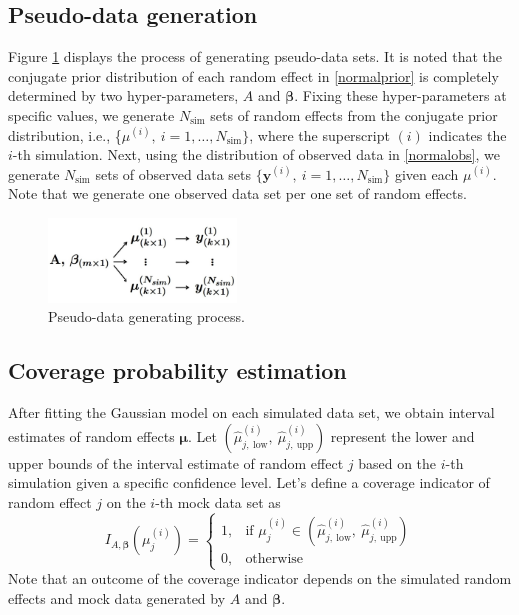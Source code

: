 \documentclass[article]{jss}
\begin{document}
\subsection{Pseudo-data generation}\label{data_generation}
Figure \ref{fig:pseudo} displays the process of generating pseudo-data sets. It is noted that  the conjugate prior distribution of each random effect in  \eqref{normalprior} is completely determined by two hyper-parameters, $A$ and $\boldsymbol{\beta}$. Fixing these hyper-parameters at specific values, we generate  $N_{\textrm{sim}}$ sets of random effects from the conjugate prior distribution, i.e., \{{\boldmath $\mu$}$^{(i)},~i=1, \ldots, N_{\textrm{sim}}\}$, where the superscript $(i)$ indicates the $i$-th simulation. Next, using the distribution of observed data in  \eqref{normalobs}, we generate $N_{\textrm{sim}}$ sets of observed data sets $\{\boldsymbol{y}^{(i)},~i=1, \ldots, N_{\textrm{sim}}\}$ given each {\boldmath$\mu$}$^{(i)}$. Note that we generate one observed data set per one set of random effects.

\begin{figure}[t]
\begin{center}
\includegraphics[width=5cm]{process.png}
\caption{Pseudo-data generating process.}
\label{fig:pseudo}
\end{center}
\end{figure}



\subsection{Coverage probability estimation}
After fitting the Gaussian model on each simulated data set, we obtain interval estimates of random effects $\boldsymbol{\mu}$. Let $(\hat{\mu}^{(i)}_{j, ~\textrm{low}}, ~\hat{\mu}^{(i)}_{j, ~\textrm{upp}})$ represent the lower and upper bounds of the interval estimate of random effect $j$ based on the $i$-th simulation given a specific confidence level.  Let's define a coverage indicator of random effect $j$ on the $i$-th mock data set as 
\begin{equation}\label{coverage_indicator}
I_{A, \boldsymbol{\beta}}(\mu_j^{(i)}) = \left\{ \begin{array}{ll}
1, & \textrm{if $\mu_j^{(i)}\in(\hat{\mu}^{(i)}_{j, ~\textrm{low}}, ~\hat{\mu}^{(i)}_{j, ~\textrm{upp}})$}\\
0, & \textrm{otherwise}
\end{array} \right.
\end{equation}
Note that an outcome of the coverage indicator depends on the simulated random effects and mock data generated by $A$ and $\boldsymbol{\beta}$. 
\end{document}
